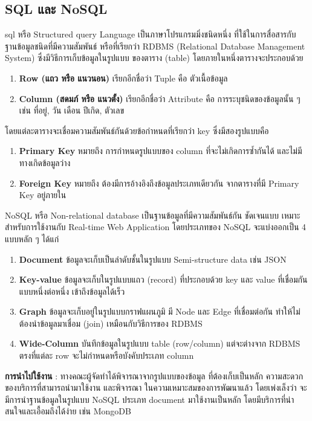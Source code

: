 \subsection{SQL และ NoSQL}
sql หรือ Structured query Language เป็นภาษาโปรแกรมมิ่งชนิดหนึ่ง
ที่ใช้ในการสื่อสารกับ ฐานข้อมูลชนิดที่มีความสัมพันธ์ หรือที่เรียกว่า RDBMS
(Relational Database Management System) ซึ่งมีวิธีการเก็บข้อมูลในรูปแบบ
ของตาราง (table) โดยภายในหนึ่งตารางจะประกอบด้วย
\begin{enumerate}
      \item \textbf{Row (แถว หรือ แนวนอน)} เรียกอีกชื่อว่า Tuple คือ
            ตัวเนื้อข้อมูล
      \item \textbf{Column (สดมภ์ หรือ แนวตั้ง)} เรียกอีกชื่อว่า Attribute
            คือ การระบุชนิดของข้อมูลนั้น ๆ เช่น ที่อยู่, วัน เดือน ปีเกิด, ตัวเลข
\end{enumerate}
\par โดยแต่ละตารางจะเชื่อมความสัมพันธ์กันด้วยข้อกำหนดที่เรียกว่า key
ซึ่งมีสองรูปแบบคือ
\begin{enumerate}
      \item \textbf{Primary Key} หมายถึง การกำหนดรูปแบบของ column
            ที่จะไม่เกิดการซ้ำกันได้ และไม่มีทางเกิดข้อมูลว่าง
      \item \textbf{Foreign Key} หมายถึง ต้องมีการอ้างอิงถึงข้อมูลประเภทเดียวกัน
            จากตารางที่มี Primary Key อยู่ภายใน
\end{enumerate}
\par NoSQL หรือ Non-relational database เป็นฐานข้อมูลที่มีความสัมพันธ์กัน
ชัดเจนแบบ เหมาะสำหรับการใช้งานกับ Real-time Web Application
โดยประเภทของ NoSQL จะแบ่งออกเป็น 4 แบบหลัก ๆ ได้แก่
\begin{enumerate}
      \item \textbf{Document} ข้อมูลจะเก็บเป็นลำดับชั้นในรูปแบบ
            Semi-structure data เช่น JSON
      \item \textbf{Key-value} ข้อมูลจะเก็บในรูปแบบแถว (record) ที่ประกอบด้วย
            key และ value ที่เชื่อมกันแบบหนึ่งต่อหนึ่ง เข้าถึงข้อมูลได้เร็ว
      \item \textbf{Graph} ข้อมูลจะเก็บอยู่ในรูปแบบกราฟแผนภูมิ มี Node และ Edge
            ที่เชื่อมต่อกัน ทำให้ไม่ต้องนำข้อมูลมาเชื่อม (join) เหมือนกับวิธีการของ RDBMS
      \item \textbf{Wide-Column} บันทึกข้อมูลในรูปแบบ table (row/column)
            แต่จะต่างจาก RDBMS ตรงที่แต่ละ row จะไม่กำหนดหรือบังคับประเภท column
\end{enumerate}
\textbf{การนำไปใช้งาน} : ทางคณะผู้จัดทำได้พิจารณาจากรูปแบบของข้อมูล
ที่ต้องเก็บเป็นหลัก ความสะดวกของบริการที่สามารถนำมาใช้งาน และพิจารณา
ในความเหมาะสมของการพัฒนาแล้ว โดยเพ่งเล็งว่า จะมีการนำฐานข้อมูลในรูปแบบ NoSQL
ประเภท document มาใช้งานเป็นหลัก โดยมีบริการที่น่าสนใจและเอื้อมถึงได้ง่าย
เช่น MongoDB
